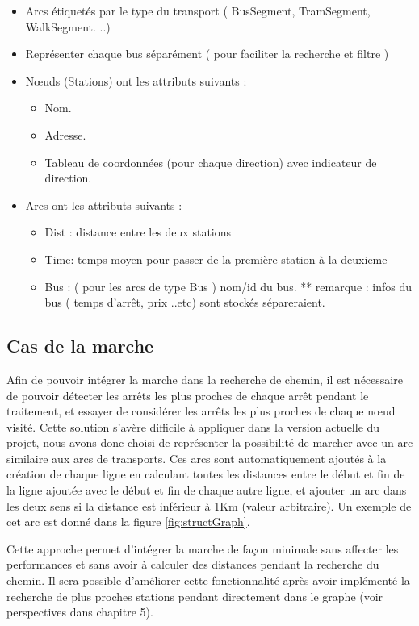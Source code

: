 	\begin{itemize}
		 \item Arcs étiquetés par le type du transport ( BusSegment, TramSegment, WalkSegment. ..) 
		 \item Représenter chaque bus séparément ( pour faciliter la recherche et filtre ) 
		 \item Nœuds (Stations) ont les attributs suivants : 
		 \begin{itemize}
		 	\item Nom.
		 	\item Adresse.
		 	\item Tableau de coordonnées (pour chaque direction) avec indicateur de direction.
		 \end{itemize}
		 \item Arcs ont les attributs suivants :
		 \begin{itemize}
		 		\item Dist : distance entre les deux stations
		 		\item Time: temps moyen pour passer de la première station à la deuxieme
		 		\item Bus : ( pour les arcs de type Bus ) nom/id du bus.
		 		** remarque : infos du bus ( temps d'arrêt, prix ..etc) sont stockés sépareraient.
		 \end{itemize}
	\end{itemize}


\subsection{Cas de la marche}
Afin de pouvoir intégrer la marche dans la recherche de chemin, il est nécessaire de pouvoir détecter les arrêts les plus proches de chaque arrêt pendant le traitement, et essayer de considérer les arrêts les plus proches de chaque nœud visité.\newline 
Cette solution s'avère difficile à appliquer dans la version actuelle du projet, nous avons donc choisi de représenter la possibilité de marcher avec un arc similaire aux arcs de transports.\newline
Ces arcs sont automatiquement ajoutés à la création de chaque ligne en calculant toutes les distances entre le début et fin de la ligne ajoutée avec le début et fin de chaque autre ligne, et ajouter un arc dans les deux sens si la distance est inférieur à 1Km (valeur arbitraire).
Un exemple de cet arc est donné dans la figure \ref{fig:structGraph}.

Cette approche permet d'intégrer la marche de façon minimale sans affecter les performances et sans avoir à calculer des distances pendant la recherche du chemin.
Il sera possible d'améliorer cette fonctionnalité après avoir implémenté la recherche de plus proches stations pendant directement dans le graphe (voir perspectives dans chapitre 5).

